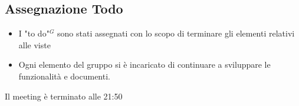 \subsection{Assegnazione Todo}
\begin{itemize}
	\item I "to do"$^{G}$ sono stati assegnati con lo scopo di terminare gli elementi relativi alle viste
	\item Ogni elemento del gruppo si è incaricato di continuare a sviluppare le funzionalità e documenti.
\end{itemize}

Il meeting è terminato alle 21:50

